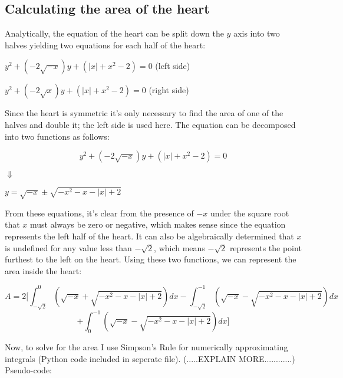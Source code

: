 \documentclass[12pt,letterpaper]{article}
\begin{document}
\begin{spacing}{1}
\begin{spacing}{1.2}
\subsection{Calculating the area of the heart}
Analytically, the equation of the heart can be split down the $y$ axis into two halves yielding two equations for each half of the heart:\newline
\begin{mdframed}[backgroundcolor=gray!5] 
$y^{2}+(-2\sqrt{-x})y+(\left|x\right|+x^{2}-2)=0$ (left side) %
\end{mdframed}
\begin{mdframed}[backgroundcolor=gray!5] 
$y^{2}+(-2\sqrt{x})y+(\left|x\right|+x^{2}-2)=0$ (right side)
\end{mdframed} %
Since the heart is symmetric it's only necessary to find the area of one of the halves and double it; the left side is used here. The equation can be decomposed into two functions as follows:\newline
\begin{mdframed}[backgroundcolor=gray!5]
$$y^{2}+(-2\sqrt{-x})y+(\left|x\right|+x^{2}-2)=0$$\begin{center}$\Downarrow$ \end{center}
\begin{center}
$y=\sqrt{-x}\pm\sqrt{-x^{2}-x-\left|x\right|+2}$
\end{center}
\end{mdframed}
From these equations, it's clear from the presence of $-x$ under the square root that $x$ must always be zero or negative, which makes sense since the equation represents the left half of the heart. It can also be algebraically determined that $x$ is undefined for any value less than $-\sqrt{2}$, which means $-\sqrt{2}$ represents the point furthest to the left on the heart.
Using these two functions, we can represent the area inside the heart:
\begin{mdframed}[backgroundcolor=gray!5]
$$A = 2 \Bigg[\int_{-\sqrt{2}}^{0} (\sqrt{-x} + \sqrt{-x^2-x-|x|+2})dx - \int_{-\sqrt{2}}^{-1} (\sqrt{-x} - \sqrt{-x^2-x-|x|+2})dx$$ $$ + \int_{0}^{-1} (\sqrt{-x} - \sqrt{-x^2-x-|x|+2})dx \Bigg]$$
\end{mdframed}
Now, to solve for the area I use Simpson's Rule for numerically approximating integrals (Python code included in seperate file). (.....EXPLAIN MORE............)
\newline Pseudo-code:

\end{spacing}
\end{spacing}
\end{document}
